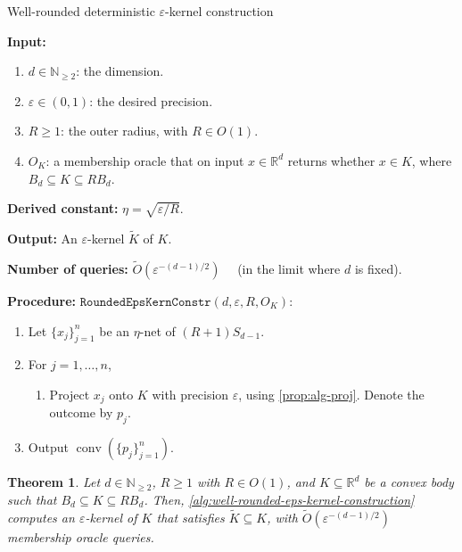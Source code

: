 \documentclass[11pt]{article}
\newtheorem{theorem}{Theorem}[section]
\newcommand{\N}{\ensuremath{\mathbb{N}}}
\newcommand{\R}{\ensuremath{\mathbb{R}}}
\DeclareMathOperator{\conv}{conv}
\begin{document}
    \begin{algorithm}[!ht]
        \caption{Well-rounded deterministic $\varepsilon$-kernel construction~\cite{yu2008practical}}
        \label{alg:well-rounded-eps-kernel-construction}
        \textbf{Input:}
        \begin{enumerate}[nosep]
            \item $d \in \N_{\geq 2}$: the dimension.
            \item $\varepsilon \in (0,1)$: the desired precision.
            \item $R \geq 1$: the outer radius, with $R \in O(1)$.
            \item $O_K$: a membership oracle that on input $x \in \R^d$ returns whether $x \in K$, where $B_d \subseteq K \subseteq RB_d$.
        \end{enumerate}
        \textbf{Derived constant:} $\eta = \sqrt{\varepsilon/R}$.

        \textbf{Output:} An $\varepsilon$-kernel $\widetilde{K}$ of $K$.

        \textbf{Number of queries:} $\widetilde{O}(\varepsilon^{-(d-1)/2})\quad$ (in the limit where $d$ is fixed).

        \textbf{Procedure:} $\texttt{RoundedEpsKernConstr}(d, \varepsilon, R, O_K)$:
        \begin{enumerate}[nosep]
            \item Let $\{x_j\}_{j=1}^n$ be an $\eta$-net of $(R+1)S_{d-1}$.
            \item For $j = 1, \dots, n$,
            \begin{enumerate}[nosep]
                \item Project $x_j$ onto $K$ with precision $\varepsilon$, using \cref{prop:alg-proj}. Denote the outcome by $p_j$.
            \end{enumerate}
            \item Output $\conv(\{p_j\}_{j=1}^n)$.
        \end{enumerate}
    \end{algorithm}

    \begin{theorem}
        \label{thm:well-rounded-eps-kernel-construction}
        Let $d \in \N_{\geq 2}$, $R \geq 1$ with $R \in O(1)$, and $K \subseteq \R^d$ be a convex body such that $B_d \subseteq K \subseteq RB_d$. Then, \cref{alg:well-rounded-eps-kernel-construction} computes an $\varepsilon$-kernel of $K$ that satisfies $\widetilde{K} \subseteq K$, with $\widetilde{O}(\varepsilon^{-(d-1)/2})$ membership oracle queries.
    \end{theorem}
\end{document}

